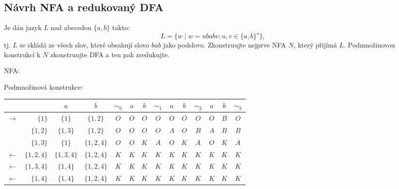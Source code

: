 \subsection{Návrh NFA a redukovaný DFA}
Je dán jazyk $L$ nad abecedou $\{a,b\}$ takto: 
\[L = \{w \mid w = ubabv; u,v\in\{a,b\}^\star\}\text{,}\] 
tj. $L$ se skládá ze všech slov, které obsahují slovo $bab$ jako podslovo. Zkonstruujte nejprve NFA $N$, který přijímá 
$L$. Podmnožinovou konstrukcí k $N$ zkonstruujte DFA a ten pak zredukujte.

NFA: 


Podmnožinová konstrukce: 

\begin{tabular}{|r r|c c||c|c c||c|c c||c|c c||c|}
    \hline
    & & $a$ & $b$ & $ \sim_0 $ & $a$ & $b$ & $\sim_1$ & $a$ & $b$ & $\sim_2$ & $a$ & $b$ & $\sim_3$ \\ \hline \hline
              $\to$ & $\{1\}$ & $\{1\}$ & $\{1,2\}$ & $O$ & $O$ & $O$ & $O$ & $O$ & $O$ & $O$ & $O$ & $B$ & $O$ \\
                & $\{1,2\}$ & $\{1,3\}$ & $\{1,2\}$ & $O$ & $O$ & $O$ & $O$ & $A$ & $O$ & $B$ & $A$ & $B$ & $B$ \\
                & $\{1,3\}$ & $\{1\}$ & $\{1,2,4\}$ & $O$ & $O$ & $K$ & $A$ & $O$ & $K$ & $A$ & $O$ & $K$ & $A$ \\
    $\gets$&$\{1,2,4\}$ & $\{1,3,4\}$ & $\{1,2,4\}$ & $K$ & $K$ & $K$ & $K$ & $K$ & $K$ & $K$ & $K$ & $K$ & $K$ \\ 
    $\gets$ & $\{1,3,4\}$ & $\{1,4\}$ & $\{1,2,4\}$ & $K$ & $K$ & $K$ & $K$ & $K$ & $K$ & $K$ & $K$ & $K$ & $K$ \\ 
    $\gets$   & $\{1,4\}$ & $\{1,4\}$ & $\{1,2,4\}$ & $K$ & $K$ & $K$ & $K$ & $K$ & $K$ & $K$ & $K$ & $K$ & $K$ \\ 
    \hline
\end{tabular}

